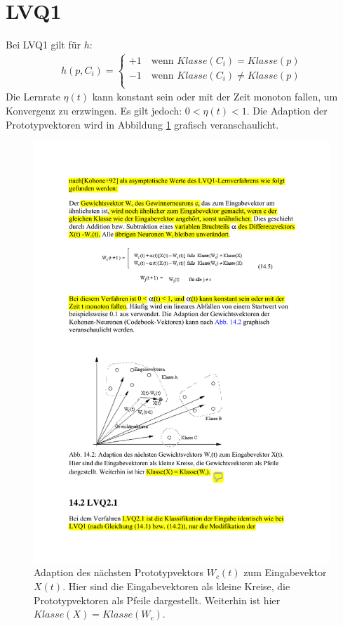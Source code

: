 \section*{LVQ1}
Bei LVQ1 gilt für $h$:
\begin{align*}
	h(p, C_i) =
	\begin{cases}
		+1 \quad \text{wenn } Klasse(C_i) = Klasse(p) \\
		-1 \quad \text{wenn } Klasse(C_i) \ne Klasse(p) \\
	\end{cases}
\end{align*}
\noindent
Die Lernrate $\eta(t)$ kann konstant sein oder mit der Zeit monoton fallen, um Konvergenz zu erzwingen. Es gilt jedoch: $0 < \eta(t) < 1$.
Die Adaption der Prototypvektoren wird in Abbildung \ref{fig:ch07_lvq1} grafisch veranschaulicht.

\begin{figure}[ht!] \centering 
	\includegraphics[width=\linewidth]{figures/ch07_lvq1.pdf}
	\caption{Adaption des nächsten Prototypvektors $W_c(t)$ zum Eingabevektor $X(t)$. Hier sind die Eingabevektoren als kleine Kreise, die Prototypvektoren als Pfeile dargestellt. Weiterhin ist hier $Klasse(X) = Klasse(W_c)$.}
	\label{fig:ch07_lvq1}
\end{figure}



